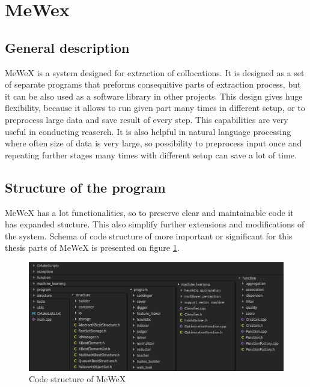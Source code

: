 \section{MeWex}

\subsection{General description}
MeWeX is a system designed for extraction of collocations. It is designed as a set of separate programs 
that preforms consequitive parts of extraction process, but it can be also used as a software library in other projects. 
This design gives huge flexibility, because it allows to run given part many times in different setup, 
or to preprocess large data and save result of every step. This capabilities are very useful in conducting reaserch. 
It is also helpful in natural language processing where often size of data is very large, so possibility 
to preprocess input once and repeating further stages many times with different setup can save a lot of time.

\subsection{Structure of the program}
MeWeX has a lot functionalities, so to preserve clear and maintainable code it has expanded stucture. 
This also simplify further extensions and modifications of the system. Schema of code structure of more important 
or significant for this thesis parts of MeWeX is presented on figure \ref{img_structure}.

\begin{figure}[ht]
	\centering
	\includegraphics[scale=0.5]{img/mewex_structure.png}
	\caption{Code structure of MeWeX}
	\label{img_structure}
\end{figure}

